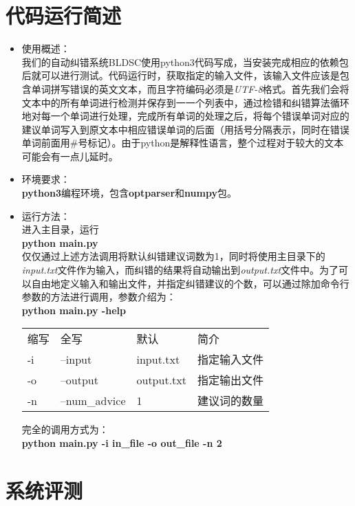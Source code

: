 \documentclass[UTF8,a4paper]{ctexart}
\begin{document}
\section{代码运行简述}

\begin{itemize}
    \item 使用概述： \\
    我们的自动纠错系统BLDSC使用python3代码写成，当安装完成相应的依赖包后就可以进行测试。代码运行时，获取指定的输入文件，该输入文件应该是包含单词拼写错误的英文文本，而且字符编码必须是\textit{UTF-8}格式。首先我们会将文本中的所有单词进行检测并保存到一一个列表中，通过检错和纠错算法循环地对每一个单词进行处理，完成所有单词的处理之后，将每个错误单词对应的建议单词写入到原文本中相应错误单词的后面（用括号分隔表示，同时在错误单词前面用\#号标记）。由于python是解释性语言，整个过程对于较大的文本可能会有一点儿延时。
  \item 环境要求： \\
  \textbf{python3}编程环境，包含\textbf{optparser}和\textbf{numpy}包。
  \item 运行方法： \\
  进入主目录，运行 \\
  \quad \textbf{python main.py} \\
  仅仅通过上述方法调用将默认纠错建议词数为1，同时将使用主目录下的\textit{input.txt}文件作为输入，而纠错的结果将自动输出到\textit{output.txt}文件中。为了可以自由地定义输入和输出文件，并指定纠错建议的个数，可以通过除加命令行参数的方法进行调用，参数介绍为： \\
  \quad \textbf{python main.py -help}

  \begin{tabular}{|l|l|l|l|}
    \hline
    缩写 & 全写 & 默认 & 简介 \\
    -i & --input & input.txt & 指定输入文件 \\
    -o & --output & output.txt & 指定输出文件 \\
    -n & --num\_advice & 1 & 建议词的数量  \\
    \hline
  \end{tabular}

  完全的调用方式为： \\
  \quad \textbf{python main.py -i in\_file -o out\_file -n 2}
\end{itemize}

\section{系统评测}
\end{document}
